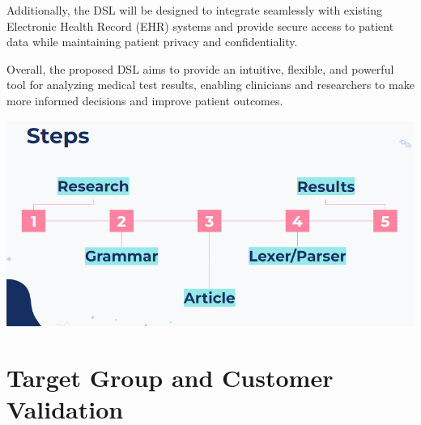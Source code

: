 Additionally, the DSL will be designed to integrate seamlessly with existing Electronic Health Record (EHR) systems and provide secure access to patient data while maintaining patient privacy and confidentiality.

Overall, the proposed DSL aims to provide an intuitive, flexible, and powerful tool for analyzing medical test results, enabling clinicians and researchers to make more informed decisions and improve patient outcomes.



\vspace{0.5cm}

{ \centering \includegraphics[width=\textwidth]{images/plan.png} }

\section{Target Group and Customer Validation}

